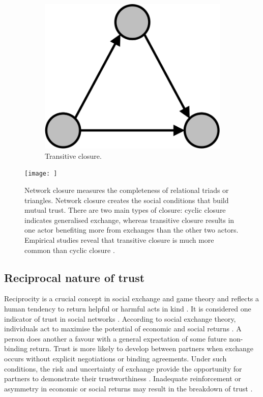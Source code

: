 \begin{figure}
\begin{subfigure}[b]{0.25\textwidth}
\includegraphics[width = \textwidth]{Images/T_Closure.png}
\caption{{Transitive closure.}}
\end{subfigure}
\texttt{[image: ]}
\caption{Network closure measures the completeness of relational triads or triangles. Network closure creates the social conditions that build mutual trust\citep{coleman1990foundations}. There are two main types of closure: cyclic closure indicates generalised exchange, whereas transitive closure results in one actor benefiting more from exchanges than the other two actors. Empirical studies reveal that transitive closure is much more common than cyclic closure \citep{davis1967structure}.}
\label{fig:closure}
\end{figure}

\subsection{Reciprocal nature of trust}

Reciprocity is a crucial concept in social exchange and game theory and reflects a human tendency to return helpful or harmful acts in kind \citep{nowak2005evolution}. It is considered one indicator of trust in social networks \citep{blau1964exchange, rempel1985trust, lusher2012trust, cropanzano2016social}. According to social exchange theory, individuals act to maximise the potential of economic and social returns \citep{homans1961social, blau1964exchange}. A person does another a favour with a general expectation of some future non-binding return. Trust is more likely to develop between partners when exchange occurs without explicit negotiations or binding agreements. Under such conditions, the risk and uncertainty of exchange provide the opportunity for partners to demonstrate their trustworthiness \citep{molm2000risk}. Inadequate reinforcement or asymmetry in economic or social returns may result in the breakdown of trust \citep{homans1961social}. \medskip

